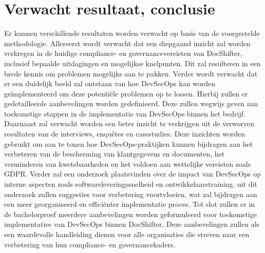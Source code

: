 \documentclass{hogent-article}
\begin{document}
    
    \section{Verwacht resultaat, conclusie}%
    \label{sec:verwachte_resultaten}
    Er kunnen verschillende resultaten worden verwacht op basis van de voorgestelde methodologie. Allereerst wordt verwacht dat een diepgaand inzicht zal worden verkregen in de huidige compliance- en governancevereisten van DocShifter, inclusief bepaalde uitdagingen en mogelijkse knelpunten. Dit zal resulteren in een brede kennis om problemen mogelijks aan te pakken.
    Verder wordt verwacht dat er een duidelijk beeld zal ontstaan van hoe DevSecOps kan worden geïmplementeerd om deze potentiële problemen op te lossen. Hierbij zullen er gedetailleerde aanbevelingen worden gedefinieerd. Deze zullen wegwijs geven aan toekomstige stappen in de implementatie van DevSecOps binnen het bedrijf.
    Daarnaast zal verwacht worden een beter inzicht te verkrijgen uit de verworven resultaten van de interviews, enquêtes en casestudies. Deze inzichten worden gebruikt om aan te tonen hoe DevSecOps-praktijken kunnen bijdragen aan het verbeteren van de bescherming van klantgegevens en documenten, het verminderen van kwetsbaarheden en het voldoen aan wettelijke vereisten zoals GDPR.
    Verder zal een onderzoek plaatsvinden over de impact van DevSecOps op interne aspecten zoals softwareleveringssnelheid en ontwikkelaarstraining. uit dit onderzoek zullen suggesties voor verbetering voortvloeien, wat zal bijdragen aan een meer georganiseerd  en efficiënter implementatie proces.
    Tot slot zullen er in de bachelorproef meerdere aanbevelingen worden geformuleerd voor toekomstige implementaties van DevSecOps binnen DocShifter. Deze aanbevelingen zullen als een waardevolle handleiding dienen voor alle organisaties die streven naar een verbetering van hun compliance- en governancekaders.
     
    
    \printbibliography[heading=bibintoc]
    
\end{document}
